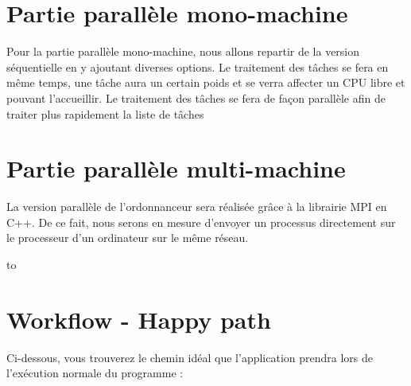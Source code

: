 \documentclass[a4paper,11pt,final]{report}
\begin{document}
\section{Partie parallèle mono-machine}

    Pour la partie parallèle mono-machine, nous allons repartir de la version séquentielle en y ajoutant diverses options. Le traitement des tâches se fera en même temps, une tâche aura un certain poids et se verra affecter un CPU libre et pouvant l'accueillir. Le traitement des tâches se fera de façon parallèle afin de traiter plus rapidement la liste de tâches


\section{Partie parallèle multi-machine}

    La version parallèle de l'ordonnanceur sera réalisée grâce à la librairie MPI en C++. De ce fait, nous serons en mesure d'envoyer un processus directement sur le processeur d'un ordinateur sur le même réseau.
    
    \begin{center}
    \hbox to
    \end{center}

\newpage 

\section{Workflow - Happy path}

    Ci-dessous, vous trouverez le chemin idéal que l'application prendra lors de l'exécution normale du programme : 
\end{document}
